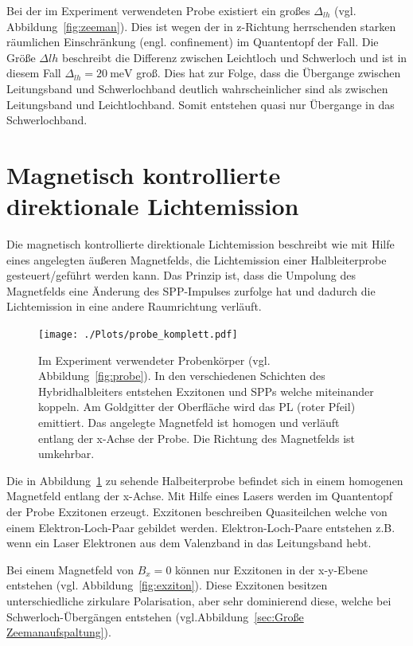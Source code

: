 Bei der im Experiment verwendeten Probe existiert ein großes $\Delta_{lh}$ (vgl. Abbildung~\ref{fig:zeeman}).
Dies ist wegen der in z-Richtung herrschenden starken räumlichen Einschränkung (engl. confinement) im Quantentopf der Fall.
Die Größe $\Delta lh$ beschreibt die Differenz zwischen Leichtloch und Schwerloch und ist
in diesem Fall $\Delta_{lh}= \SI{20}{\milli\eV}$ groß.
Dies hat zur Folge, dass die Übergange zwischen Leitungsband und Schwerlochband deutlich
wahrscheinlicher sind als zwischen Leitungsband und Leichtlochband. Somit entstehen quasi nur 
Übergange in das Schwerlochband.


\section{Magnetisch kontrollierte direktionale Lichtemission}
Die magnetisch kontrollierte direktionale Lichtemission
beschreibt wie mit Hilfe eines angelegten äußeren Magnetfelds, die Lichtemission
einer Halbleiterprobe gesteuert/geführt werden kann.
Das Prinzip ist, dass die Umpolung des Magnetfelds eine Änderung des SPP-Impulses zurfolge hat 
und dadurch die Lichtemission in eine andere Raumrichtung verläuft.
\begin{figure}
    \centering
    \texttt{[image: ./Plots/probe\_komplett.pdf]}
    \caption{Im Experiment verwendeter Probenkörper (vgl. Abbildung~\ref{fig:probe}).
    In den verschiedenen Schichten des Hybridhalbleiters entstehen Exzitonen und SPPs 
    welche miteinander koppeln. Am Goldgitter der Oberfläche wird das PL (roter Pfeil)
    emittiert.    
    Das angelegte Magnetfeld ist homogen und verläuft entlang der x-Achse der Probe.
    Die Richtung des Magnetfelds ist umkehrbar.}
    \label{fig:komplett}
\end{figure}
\FloatBarrier

Die in Abbildung~\ref{fig:komplett} zu sehende Halbeiterprobe befindet sich 
in einem homogenen Magnetfeld entlang der x-Achse.
Mit Hilfe eines Lasers werden im Quantentopf der Probe Exzitonen erzeugt.
Exzitonen beschreiben Quasiteilchen welche von einem Elektron-Loch-Paar gebildet werden.
Elektron-Loch-Paare entstehen z.B. wenn ein Laser 
Elektronen aus dem Valenzband in das Leitungsband hebt.\cite{jens}

Bei einem Magnetfeld von $B_x = 0$ können nur Exzitonen in der x-y-Ebene entstehen (vgl. Abbildung~\ref{fig:exziton}).\cite{felix}
Diese Exzitonen besitzen unterschiedliche zirkulare Polarisation, aber sehr dominierend diese, welche bei 
Schwerloch-Übergängen entstehen (vgl.Abbildung~\ref{sec:Große Zeemanaufspaltung}).

